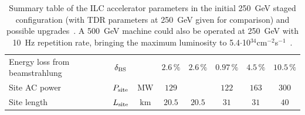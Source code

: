 \begin{table}[tbhp]
\begin{adjustbox}{width=1.\textwidth,center=\textwidth}
\begin{tabular}{lccccccc}
Energy loss from beamstrahlung  & $\delta_{\mathrm{BS}}$ &  & $2.6\,\%$  & $2.6\,\%$  & $0.97\,\%$  & $4.5\,\%$ & $10.5\,\%$ \\
Site AC power  & $P_{\mathrm{{site}}}$ &  ${\mathrm{MW}}$ & $129$ & & $122$ & $163$ & $300$ \\
Site length & $L_{\mathrm{{site}}}$ &  ${\mathrm{km}}$ & $20.5$ & $20.5$ & $31$ & $31$ & $40$ \\
\end{tabular}
\caption{Summary table of the ILC accelerator parameters in the initial 250~GeV staged configuration (with TDR parameters at 250~GeV given for comparison) and possible upgrades~\cite{Bambade:2019fyw}. A 500~GeV machine could also be operated at 250~GeV with 10~Hz repetition rate, bringing the maximum luminosity to 5.4$\cdot$10$^{34}$cm$^{-2}$s$^{-1}$~\cite{Harrison:2013nva}.
\label{tab:ilc-params}}
\end{adjustbox}
\end{table}

